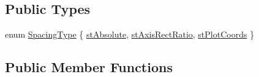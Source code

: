 \subsection*{Public Types}
\begin{DoxyCompactItemize}
\item 
enum \hyperlink{classQCPBarsGroup_a4c0521120a97e60bbca37677a37075b6}{Spacing\+Type} \{ \hyperlink{classQCPBarsGroup_a4c0521120a97e60bbca37677a37075b6ab53fa3efaf14867dd0f14d41d64e42ac}{st\+Absolute}, 
\hyperlink{classQCPBarsGroup_a4c0521120a97e60bbca37677a37075b6ae94b05c27bc985dcdd8b1e1b7f163d26}{st\+Axis\+Rect\+Ratio}, 
\hyperlink{classQCPBarsGroup_a4c0521120a97e60bbca37677a37075b6ad369cee6287e0a86e8c2b643a3168c54}{st\+Plot\+Coords}
 \}
\end{DoxyCompactItemize}
\subsection*{Public Member Functions}
